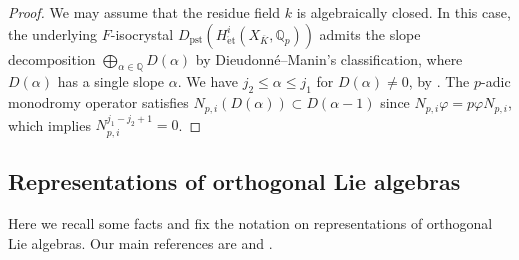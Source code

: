 \documentclass[12pt,reqno]{amsart}
\theoremstyle{definition}
\newcommand{\Q}{{\mathds Q}}
\newcommand{\et}{\mathrm{\acute{e}t}}
\DeclareMathOperator{\pst}{pst}
\numberwithin{equation}{section}
\begin{document}
\begin{proof}
We may assume that the residue field $k$ is algebraically closed. In this case, the underlying $F$-isocrystal $D_{\pst}(H^i_{\et}(X_{\overline{K}},\Q_p))$ admits the slope decomposition $\bigoplus_{\alpha \in \Q} D(\alpha)$ by Dieudonné--Manin's classification, where 
$D(\alpha)$ has a single slope $\alpha$.
We have $j_2 \leq \alpha \leq j_1$ for $D(\alpha)\neq 0$, by \cite[Proposition 5.4.2, Remark 4.4.6]{Fontaine94III}.
The $p$-adic monodromy operator satisfies $N_{p,i}\left(D(\alpha)\right) \subset D(\alpha-1)$ since $N_{p, i}\varphi=p \varphi N_{p, i}$, which implies $N^{j_1-j_2+1}_{p, i}=0$.
\end{proof}




\subsection{Representations of orthogonal Lie algebras}\label{Subsection:orthogonal Lie algebra}

Here we recall some facts and fix the notation on representations of orthogonal Lie algebras.
Our main references are \cite{FultonHarris} and \cite[Appendix A]{GKLR}.
\end{document}

